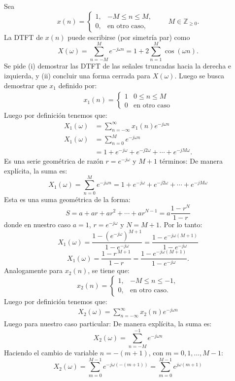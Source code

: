 \documentclass[
  11pt,
  letterpaper,
   addpoints,
   answers
  ]{exam}
\begin{document}
\begin{questions}
\begin{solution}
Sea
\[
x(n)=
\begin{cases}
1, & -M\le n\le M,\\
0, & \text{en otro caso},
\end{cases}
\qquad M\in\mathbb{Z}_{\ge 0}.
\]
La DTFT de $x(n)$ puede escribirse (por simetría par) como
\[
X(\omega)=\sum_{n=-M}^{M}e^{-j\omega n}=1+2\sum_{n=1}^{M}\cos(\omega n).
\]
Se pide (i) demostrar las DTFT de las señales truncadas hacia la derecha e izquierda, y (ii) concluir una forma cerrada para $X(\omega)$. Luego se busca demostrar que $x_{1} $ definido por:
\begin{align}
x_1(n) = \begin{cases}
1 & 0 \leq n \leq M \\
0 & \text{en otro caso}
\end{cases}
\end{align}
Luego por definición tenemos que:
\begin{align}
X_1(\omega) &= \sum_{n=-\infty}^{\infty} x_1(n)e^{-j\omega n} \\
X_1(\omega)&=\sum_{n=0}^{M}e^{-j\omega n} \\
&=1+e^{-j\omega}+e^{-j2\omega}+\cdots+e^{-jM\omega}.
\end{align}
Es una serie geométrica de razón $r=e^{-j\omega}$ y $M{+}1$ términos:
De manera explícita, la suma es:
\[
X_1(\omega) = \sum_{n=0}^{M} e^{-j\omega n} = 1 + e^{-j\omega} + e^{-j2\omega} + \cdots + e^{-jM\omega}
\]
Esta es una suma geométrica de la forma:
\[
S = a + ar + ar^2 + \cdots + ar^{N-1} = a \frac{1 - r^{N}}{1 - r}
\]
donde en nuestro caso $a=1$, $r=e^{-j\omega}$ y $N=M+1$. Por lo tanto:
\[
X_1(\omega) = \frac{1 - (e^{-j\omega})^{M+1}}{1 - e^{-j\omega}} = \frac{1 - e^{-j\omega(M+1)}}{1 - e^{-j\omega}}
\]
\[
\boxed{~
X_1(\omega)=\frac{1-r^{\,M+1}}{1-r}
=\frac{1-e^{-j\omega(M+1)}}{1-e^{-j\omega}}. ~}
\]
Analogamente para $x_2(n)$, se tiene que:
\[
x_2(n)=
\begin{cases}
1, & -M\le n\le -1,\\
0, & \text{en otro caso}.
\end{cases}
\]
Luego por definición tenemos que:
\begin{align}
X_2(\omega) = \sum_{n=-\infty}^{\infty
} x_2(n)e^{-j\omega n}
\end{align}
Luego para nuestro caso particular:
De manera explícita, la suma es:
\[
X_2(\omega) = \sum_{n=-M}^{-1} e^{-j\omega n}
\]
Haciendo el cambio de variable $n = -(m+1)$, con $m = 0, 1, \dots, M-1$:
\[
X_2(\omega) = \sum_{m=0}^{M-1} e^{-j\omega (-(m+1))} = \sum_{m=0}^{M-1} e^{j\omega (m+1)}
\]
\end{solution}
\end{questions}
\end{document}
